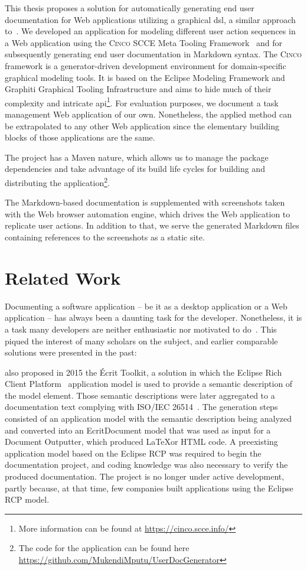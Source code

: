 This thesis proposes a solution for automatically generating end user documentation for Web applications utilizing a graphical \gls*{dsl}, a similar approach to~\cite{bosselmann-et_al}. We developed an application for modeling different user action sequences in a Web application using the \textsc{Cinco} SCCE Meta Tooling Framework~\cite{Cinco} and for subsequently generating end user documentation in Markdown syntax. The \textsc{Cinco} framework is a generator-driven development environment for domain-specific graphical modeling tools. It is based on the Eclipse Modeling Framework and Graphiti Graphical Tooling Infrastructure and aims to hide much of their complexity and intricate \gls{api}\footnote{More information can be found at \url{https://cinco.scce.info/}}. For evaluation purposes, we document a task management Web application of our own. Nonetheless, the applied method can be extrapolated to any other Web application since the elementary building blocks of those applications are the same.

The project has a Maven nature, which allows us to manage the package dependencies and take advantage of its build life cycles for building and distributing the application\footnote{The code for the application can be found here \url{https://github.com/MukendiMputu/UserDocGenerator}}.

The Markdown-based documentation is supplemented with screenshots taken with the Web browser automation engine, which drives the Web application to replicate user actions. In addition to that, we serve the generated Markdown files containing references to the screenshots as a static site.

\section{Related Work}\label{sec:relWork}

Documenting a software application -- be it as a desktop application or a Web application -- has always been a daunting task for the developer. Nonetheless, it is a task many developers are neither enthusiastic nor motivated to do~\cite{kipyegen2013importance}. This piqued the interest of many scholars on the subject, and earlier comparable solutions were presented in the past:

\cite{descher_et-al} also proposed in 2015 the Écrit Toolkit, a solution in which the Eclipse Rich Client Platform~\cite{eclipseRCP} application model is used to provide a semantic description of the model element. Those semantic descriptions were later aggregated to a documentation text complying with ISO/IEC 26514~\cite{descher_et-al}. The generation steps consisted of an application model with the semantic description being analyzed and converted into an EcritDocument model that was used as input for a Document Outputter, which produced \LaTeX or HTML code. A preexisting application model based on the Eclipse RCP was required to begin the documentation project, and coding knowledge was also necessary to verify the produced documentation. The project is no longer under active development, partly because, at that time, few companies built applications using the Eclipse RCP model. 

